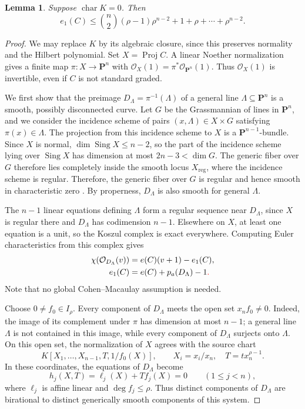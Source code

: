 \documentclass[12pt]{amsart}
\numberwithin{equation}{section}
\newtheorem{lemma}[theorem]{Lemma}
\theoremstyle{definition}
\theoremstyle{remark}
\numberwithin{equation}{section}
\begin{document}
\begin{lemma}\label{lem:charzero-e1}
	Suppose $\operatorname{char}K=0$. Then
	\[
	e_1(C)\le \binom n2(\rho-1)\rho^{n-2}+1+\rho+\cdots+\rho^{n-2}.
	\]
\end{lemma}
\begin{proof}
We may replace $K$ by its algebraic closure, since this preserves normality and the Hilbert polynomial. Set $X=\operatorname{Proj}C$.
A linear Noether	normalization gives a finite map $\pi:X\to\mathbf P^n$ with $\mathcal O_X(1)=\pi^*\mathcal O_{\mathbf P^n}(1)$. Thus
$\mathcal O_X(1)$ is invertible, even if $C$ is not standard graded.
	
We first show that the preimage $D_\Lambda=\pi^{-1}(\Lambda)$ of a general line $\Lambda\subseteq\mathbf P^n$	is a smooth,
possibly disconnected curve. Let $G$ be the Grassmannian of lines in $\mathbf P^n$,  and we consider the incidence scheme of pairs $(x,\Lambda)\in X\times G$ satisfying $\pi(x)\in\Lambda$. The projection from this incidence scheme to $X$ is a $\mathbf P^{n-1}$-bundle. Since $X$ is normal, $\dim \operatorname{Sing}X \le n-2$, so the part of the incidence scheme lying over	$\operatorname{Sing}X$ has dimension at most $2n-3<\dim G$.
	The generic fiber over $G$ therefore lies completely inside the smooth locus $X_{\mathrm{reg}}$, where the	incidence scheme is regular.
	Therefore,  the generic fiber over $G$ is regular and hence smooth in characteristic zero \cite[Tag~038S]{Stacks}.
By properness, $D_\Lambda$ is also smooth for general $\Lambda$.
	
	The $n-1$ linear equations defining $\Lambda$ form a regular sequence near $D_\Lambda$, since  $X$ is regular there and $D_\Lambda$ has codimension $n-1$. Elsewhere on $X$, at least one equation is a unit, so the Koszul complex is exact everywhere.
Computing Euler characteristics from this complex gives
\begin{equation}\label{eq:section-genus}
	\begin{aligned}
		\chi(\mathcal O_{D_\Lambda}(v))&=e(C)(v+1)-e_1(C),\\
		e_1(C)&=e(C)+p_a(D_\Lambda)-1\textcolor{red}{.}
	\end{aligned}
\end{equation}
Note that no global Cohen--Macaulay assumption is needed.

Choose $0\ne f_0\in I_\rho$. Every component of $D_\Lambda$ meets the open set $x_nf_0\ne0$. Indeed, the image of its complement under $\pi$ has dimension at most $n-1$;  a general line  $\Lambda$ is not contained in this image, while every component of $D_\Lambda$ surjects onto $\Lambda$.
On this open set,  the normalization of $X$ agrees with the source chart
	\[
	K[X_1,\ldots,X_{n-1},T,1/f_0(X)],\qquad
	X_i=x_i/x_n,\quad T=t x_n^{\rho-1}.
	\]
In these coordinates, the equations of $D_\Lambda$ become
	\[
	h_j(X,T)=\ell_j(X)+T f_j(X)=0\qquad(1\le j<n),
	\]
	where $\ell_j$ is affine linear and $\deg f_j\le\rho$.
	Thus distinct components of $D_\Lambda$ are birational to distinct generically smooth components of this system.
	

\end{proof}
\end{document}
